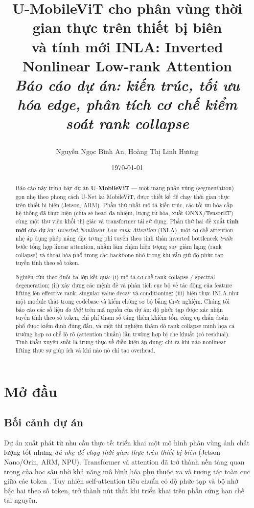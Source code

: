 \documentclass[12pt,a4paper]{article}
\title{
    \vspace{-1.8cm}
    \begin{center}
        \vspace{0.5cm}
        \LARGE \textbf{U-MobileViT cho phân vùng thời gian thực trên thiết bị biên} \\
        \LARGE \textbf{và tính mới INLA: Inverted Nonlinear Low-rank Attention} \\
        \Large \textit{Báo cáo dự án: kiến trúc, tối ưu hóa edge, phân tích cơ chế kiểm soát rank collapse} \\
        \vspace{0.5cm}
    \end{center}
}
\author{Nguyễn Ngọc Bình An, Hoàng Thị Linh Hương}
\date{\today}
\begin{document}
\maketitle

\begin{abstract}
Báo cáo này trình bày dự án \textbf{U-MobileViT} --- một mạng phân vùng (segmentation) gọn nhẹ
theo phong cách U-Net lai MobileViT, được thiết kế để chạy thời gian thực trên thiết bị biên
(Jetson, ARM). Phần thứ nhất mô tả kiến trúc, các tối ưu hóa cấp hệ thống đã thực hiện
(chia sẻ head đa nhiệm, lượng tử hóa, xuất ONNX/TensorRT) cùng một thư viện khối thị giác và
transformer tái sử dụng. Phần thứ hai đề xuất \textbf{tính mới} của dự án:
\emph{Inverted Nonlinear Low-rank Attention} (INLA), một cơ chế attention nhẹ áp dụng phép nâng
đặc trưng phi tuyến theo tinh thần inverted bottleneck \emph{trước} bước tổng hợp linear attention,
nhằm làm chậm hiện tượng suy giảm hạng (rank collapse) và thoái hóa phổ trong các backbone nhỏ
trong khi vẫn giữ độ phức tạp tuyến tính theo số token.

Nghiên cứu theo đuổi ba lớp kết quả: (i) mô tả cơ chế rank collapse / spectral degeneration;
(ii) xây dựng các mệnh đề và phân tích cục bộ về tác động của feature lifting lên effective rank,
singular value decay và conditioning; (iii) hiện thực INLA như một module thật trong codebase và
kiểm chứng sơ bộ bằng thực nghiệm. Chúng tôi báo cáo các số liệu \emph{đo thật} trên mã nguồn của
dự án: độ phức tạp được xác nhận tuyến tính theo số token, chi phí tham số tăng thêm khiêm tốn,
công cụ chẩn đoán phổ được kiểm định đúng đắn, và một thí nghiệm thăm dò rank collapse minh họa cả
trường hợp cơ chế lộ rõ (attention thuần) lẫn trường hợp bị che khuất (có residual). Tinh thần
xuyên suốt là trung thực về điều kiện áp dụng: chỉ ra khi nào nonlinear lifting thực sự giúp ích và
khi nào nó chỉ tạo overhead.
\end{abstract}

\tableofcontents
\newpage

\section{Mở đầu}

\subsection{Bối cảnh dự án}
Dự án xuất phát từ nhu cầu thực tế: triển khai một mô hình phân vùng ảnh chất lượng tốt nhưng
\emph{đủ nhẹ để chạy thời gian thực trên thiết bị biên} (Jetson Nano/Orin, ARM, NPU). Transformer
và attention đã trở thành nền tảng quan trọng của học sâu nhờ khả năng mô hình hóa phụ thuộc xa và
tương tác toàn cục giữa các token \cite{vaswani2017attention}. Tuy nhiên self-attention tiêu chuẩn
có độ phức tạp và bộ nhớ bậc hai theo số token, trở thành nút thắt khi triển khai trên phần cứng
hạn chế tài nguyên.
\end{document}
